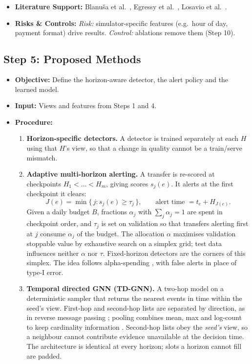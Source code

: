 \documentclass[11pt,a4paper]{article}
\begin{document}
\begin{itemize}[leftmargin=*]
    \item \textbf{Literature Support:} Blanu\v{s}a et al.\ \cite{blanusa2024gfp}, Egressy et al.\ \cite{egressy2024multigraph}, Losavio et al.\ \cite{losavio2026saltgnn}.
    \item \textbf{Risks \& Controls:} \textit{Risk:} simulator-specific features (e.g.\ hour of day, payment format) drive results. \textit{Control:} ablations remove them (Step 10).
\end{itemize}

\subsection{Step 5: Proposed Methods}
\begin{itemize}[leftmargin=*]
    \item \textbf{Objective:} Define the horizon-aware detector, the alert policy and the learned model.
    \item \textbf{Input:} Views and features from Steps 1 and 4.
    \item \textbf{Procedure:}
    \begin{enumerate}[leftmargin=*]
        \item \textbf{Horizon-specific detectors.} A detector is trained separately at each $H$ using that $H$'s view, so that a change in quality cannot be a train/serve mismatch.
        \item \textbf{Adaptive multi-horizon alerting.} A transfer is re-scored at checkpoints $H_1<\dots<H_m$, giving scores $s_j(e)$. It alerts at the first checkpoint it clears:
        \begin{equation}
            J(e)=\min\{\,j : s_j(e)\ge\tau_j\,\}, \qquad \text{alert time } = t_e+H_{J(e)}.
        \end{equation}
        Given a daily budget $B$, fractions $\alpha_j$ with $\sum_j\alpha_j=1$ are spent in checkpoint order, and $\tau_j$ is set on validation so that transfers alerting first at $j$ consume $\alpha_j$ of the budget. The allocation $\alpha$ maximises validation stoppable value by exhaustive search on a simplex grid; test data influences neither $\alpha$ nor $\tau$. Fixed-horizon detectors are the corners of this simplex. The idea follows alpha-spending \cite{lan1983alpha}, with false alerts in place of type-I error.
        \item \textbf{Temporal directed GNN (TD-GNN).} A two-hop model on a deterministic sampler that returns the nearest events in time within the seed's view. First-hop and second-hop lists are separated by direction, as in reverse message passing \cite{egressy2024multigraph}; pooling combines mean, max and log-count to keep cardinality information \cite{losavio2026saltgnn}. Second-hop lists obey the \emph{seed's} view, so a neighbour cannot contribute evidence unavailable at the decision time. The architecture is identical at every horizon; slots a horizon cannot fill are padded.

\end{enumerate}
\end{itemize}
\end{document}
